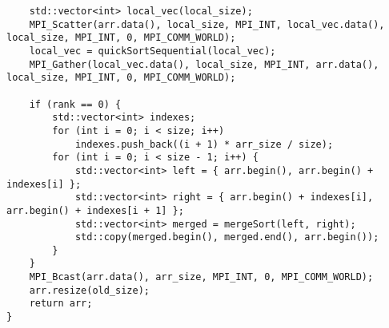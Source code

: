 \documentclass{report}
\begin{document}
\begin{lstlisting}
    std::vector<int> local_vec(local_size);
    MPI_Scatter(arr.data(), local_size, MPI_INT, local_vec.data(), local_size, MPI_INT, 0, MPI_COMM_WORLD);
    local_vec = quickSortSequential(local_vec);
    MPI_Gather(local_vec.data(), local_size, MPI_INT, arr.data(), local_size, MPI_INT, 0, MPI_COMM_WORLD);

    if (rank == 0) {
        std::vector<int> indexes;
        for (int i = 0; i < size; i++)
            indexes.push_back((i + 1) * arr_size / size);
        for (int i = 0; i < size - 1; i++) {
            std::vector<int> left = { arr.begin(), arr.begin() + indexes[i] };
            std::vector<int> right = { arr.begin() + indexes[i], arr.begin() + indexes[i + 1] };
            std::vector<int> merged = mergeSort(left, right);
            std::copy(merged.begin(), merged.end(), arr.begin());
        }
    }
    MPI_Bcast(arr.data(), arr_size, MPI_INT, 0, MPI_COMM_WORLD);
    arr.resize(old_size);
    return arr;
}
\end{lstlisting}
\end{document}
